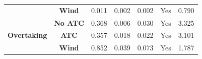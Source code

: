 \begin{table}
\begin{tabular}{ccccccc}
                                                                                                & \textbf{Wind}                   & 0.011                 & 0.002                 & 0.002                        & Yes                                                                                                   & 0.790                                                                                                    \\ 
\cline{2-7}
\multirow{3}{*}{\textbf{Overtaking}}                                                            & \textbf{No ATC}                 & 0.368            & 0.006            & 0.030                   & Yes                                                                                                & 3.325                                                                                               \\
                                                                                                & \textbf{ATC}                    & 0.357            & 0.018            & 0.022                   & Yes                                                                                                & 3.101                                                                                               \\
                                                                                                & \textbf{Wind}                   & 0.852            & 0.039            & 0.073                   & Yes                                                                                                & 1.787                                                                                               \\
\bottomrule
\end{tabular}
\end{table}
